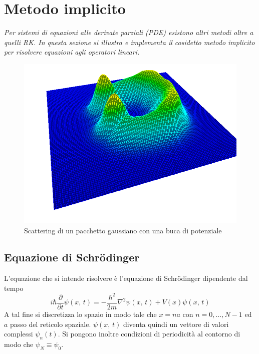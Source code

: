 \chapter{\huge Metodo implicito}

\textit{Per sistemi di equazioni alle derivate parziali (PDE) esistono altri metodi oltre a quelli RK. In questa sezione si illustra e implementa il cosidetto metodo implicito per risolvere equazioni agli operatori lineari.}

\begin{figure}[H]
\centering
\includegraphics[width=\textwidth]{schrodinger}
\caption{Scattering di un pacchetto gaussiano con una buca di potenziale}
\label{fig:schrodinger}
\end{figure}

\section{Equazione di Schr\"{o}dinger}

L'equazione che si intende risolvere è l'equazione di Schr\"odinger dipendente dal tempo
$$i\hbar\frac{\partial}{\partial t} \psi(x,\,t) = -\frac{\hbar^2}{2m}\nabla^2\psi(x,\,t) + V(x)\psi(x,\,t)$$
A tal fine si discretizza lo spazio in modo tale che $x=na$ con $n=0,...,N-1$ ed $a$ passo del reticolo spaziale. $\psi(x,\,t)$ diventa quindi un vettore di valori complessi $\psi_n(t)$. Si pongono inoltre condizioni di periodicità al contorno di modo che $\psi_N \equiv \psi_0$.

